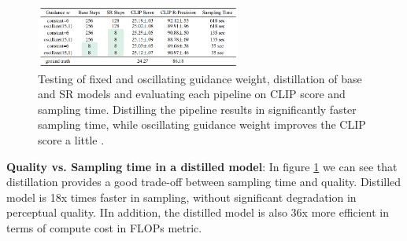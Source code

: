 \begin{figure}
    \centering
    \includegraphics[width=0.6\textwidth]{images/imagen_video/experiments_table.png}
    \caption{Testing of fixed and oscillating guidance weight, distillation of base and SR models and evaluating each pipeline on CLIP score and sampling time. Distilling the pipeline results in significantly faster sampling time, while oscillating guidance weight improves the CLIP score a little \cite{imagen_video}.}
    \label{fig:imagen_video_experiments_table}
\end{figure}

\textbf{Quality vs. Sampling time in a distilled model}: In figure \ref{fig:imagen_video_experiments_table} we can see that distillation provides a good trade-off between sampling time and quality. Distilled model is 18x times faster in sampling, without significant degradation in perceptual quality. IIn addition, the distilled model is also 36x more efficient in terms of compute cost in FLOPs metric. 

